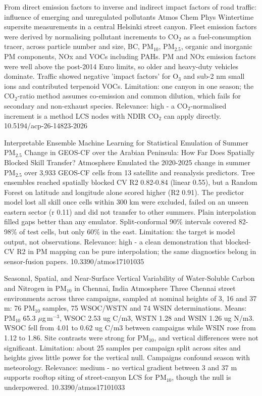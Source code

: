 \documentclass[10pt]{article}
\begin{document}
{From direct emission factors to inverse and indirect impact factors of road traffic: influence of emerging and unregulated pollutants}
{Atmos Chem Phys}
{Wintertime supersite measurements in a central Helsinki street canyon. Fleet emission factors were derived by normalising pollutant increments to CO$_2$ as a fuel-consumption tracer, across particle number and size, BC, PM$_{10}$, PM$_{2.5}$, organic and inorganic PM components, NOx and VOCs including PAHs. PM and NOx emission factors were well above the post-2014 Euro limits, so older and heavy-duty vehicles dominate. Traffic showed negative 'impact factors' for O$_3$ and sub-2 nm small ions and contributed terpenoid VOCs. Limitation: one canyon in one season; the CO$_2$-ratio method assumes co-emission and common dilution, which fails for secondary and non-exhaust species. Relevance: high - a CO$_2$-normalised increment is a method LCS nodes with NDIR CO$_2$ can apply directly.}
{10.5194/acp-26-14823-2026}

{Interpretable Ensemble Machine Learning for Statistical Emulation of Summer PM$_{2.5}$ Change in GEOS-CF over the Arabian Peninsula: How Far Does Spatially Blocked Skill Transfer?}
{Atmosphere}
{Emulated the 2020-2025 change in summer PM$_{2.5}$ over 3,933 GEOS-CF cells from 13 satellite and reanalysis predictors. Tree ensembles reached spatially blocked CV R2 0.82-0.84 (linear 0.55), but a Random Forest on latitude and longitude alone scored higher (R2 0.91). The predictor model lost all skill once cells within 300 km were excluded, failed on an unseen eastern sector (r 0.11) and did not transfer to other summers. Plain interpolation filled gaps better than any emulator. Split-conformal 90\% intervals covered 82-98\% of test cells, but only 60\% in the east. Limitation: the target is model output, not observations. Relevance: high - a clean demonstration that blocked-CV R2 in PM mapping can be pure interpolation; the same diagnostics belong in sensor-fusion papers.}
{10.3390/atmos17101035}

{Seasonal, Spatial, and Near-Surface Vertical Variability of Water-Soluble Carbon and Nitrogen in PM$_{10}$ in Chennai, India}
{Atmosphere}
{Three Chennai street environments across three campaigns, sampled at nominal heights of 3, 16 and 37 m: 76 PM$_{10}$ samples, 75 WSOC/WSTN and 74 WSIN determinations. Means: PM$_{10}$ 65.3 $\mu$g\,m$^{-3}$, WSOC 2.53 ug C/m3, WSTN 1.28 and WSIN 1.26 ug N/m3. WSOC fell from 4.01 to 0.62 ug C/m3 between campaigns while WSIN rose from 1.12 to 1.86. Site contrasts were strong for PM$_{10}$, and vertical differences were not significant. Limitation: about 25 samples per campaign split across sites and heights gives little power for the vertical null. Campaigns confound season with meteorology. Relevance: medium - no vertical gradient between 3 and 37 m supports rooftop siting of street-canyon LCS for PM$_{10}$, though the null is underpowered.}
{10.3390/atmos17101033}
\end{document}
